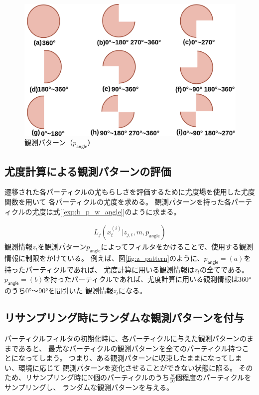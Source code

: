 \newpage

\begin{figure}[H]
  \begin{center}
    \includegraphics[width=0.8\linewidth]{figs/obs_pangle.png}
    \caption{観測パターン（$p_\mathsf{angle}$）}
    \label{fig:1}
  \end{center}
\end{figure}

\subsection{尤度計算による観測パターンの評価}

遷移された各パーティクルの尤もらしさを評価するために尤度場を使用した尤度関数を用いて
各パーティクルの尤度を求める。
観測パターンを持った各パーティクルの尤度は式[\ref{exp:b_p_w_angle}]のように求まる。

\begin{eqnarray}
  \label{exp:b_p_w_angle}
  L_j(x_{t}^{(i)} | z_{j, t}, m, p_\mathsf{angle})
\end{eqnarray}
観測情報$z_t$を観測パターン$p_\mathsf{angle}$によってフィルタをかけることで、使用する観測情報に制限をかけている。
例えば、図\ref{fig:z_pattern}のように、$p_\mathsf{angle} = (a)$を持ったパーティクルであれば、
尤度計算に用いる観測情報は$z_t$の全てである。
$p_\mathsf{angle} = (b)$を持ったパーティクルであれば、尤度計算に用いる観測情報は$360°$のうち$0°〜90°$を間引いた
観測情報$z_t$になる。


\subsection{リサンプリング時にランダムな観測パターンを付与}

パーティクルフィルタの初期化時に、各パーティクルに与えた観測パターンのままであると、
最尤なパーティクルの観測パターンを全てのパーティクル持つことになってしまう。
つまり、ある観測パターンに収束したままになってしまい、環境に応じて
観測パターンを変化させることができない状態に陥る。
そのため、リサンプリング時にN個のパーティクルのうち$\frac{N}{10}$個程度のパーティクルをサンプリングし、
ランダムな観測パターンを与える。

